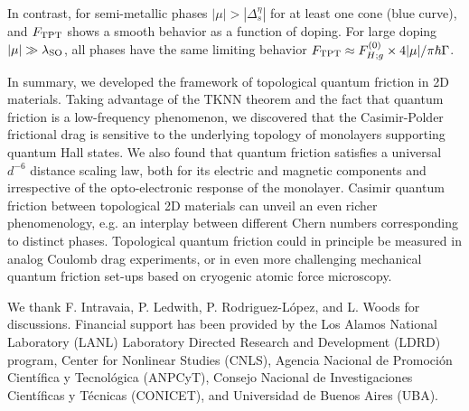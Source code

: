 \documentclass[10pt,aps,prl,superscriptaddress,showpacs,twocolumn]{revtex4-1}
\begin{document}
In contrast, for semi-metallic phases $|\mu| > |\Delta^{\eta}_s|$ for at least one cone (blue curve), and $F_{\rm TPT}$ shows a smooth behavior as a function of doping. For large doping $|\mu| \gg \lambda_{\rm SO}$, all phases have the same limiting behavior $F_{\rm TPT} \approx F_{H;g}^{(0)} \times 4 |\mu| / \pi \hbar \Gamma$.

In summary, we developed the framework of topological quantum friction in 2D materials. 
Taking advantage of the TKNN theorem and the fact that quantum friction is a low-frequency phenomenon, we discovered that the Casimir-Polder frictional drag is sensitive to the underlying topology of monolayers supporting quantum Hall states. We also found that quantum friction satisfies a universal $d^{-6}$ distance scaling law, both for its electric and magnetic components and irrespective of the opto-electronic response of the monolayer. Casimir quantum friction between topological 2D materials can unveil an even richer phenomenology, e.g. an interplay between different Chern numbers corresponding to distinct phases. Topological quantum friction could in principle be measured in analog Coulomb drag experiments,
or in even more challenging mechanical quantum friction set-ups based on cryogenic atomic force microscopy. 
 

\begin{acknowledgments} 
We thank F. Intravaia, P. Ledwith, P. Rodriguez-L\'opez, and L. Woods for discussions. Financial support has been provided by the Los Alamos National Laboratory (LANL) Laboratory Directed Research and Development (LDRD) program, Center for Nonlinear Studies (CNLS), Agencia Nacional de Promoci\' on Cient\'ifica y Tecnol\'ogica (ANPCyT), Consejo Nacional de Investigaciones Cient\'ificas y T\'ecnicas  (CONICET), and Universidad de Buenos Aires (UBA).
\end{acknowledgments}


\end{document}
